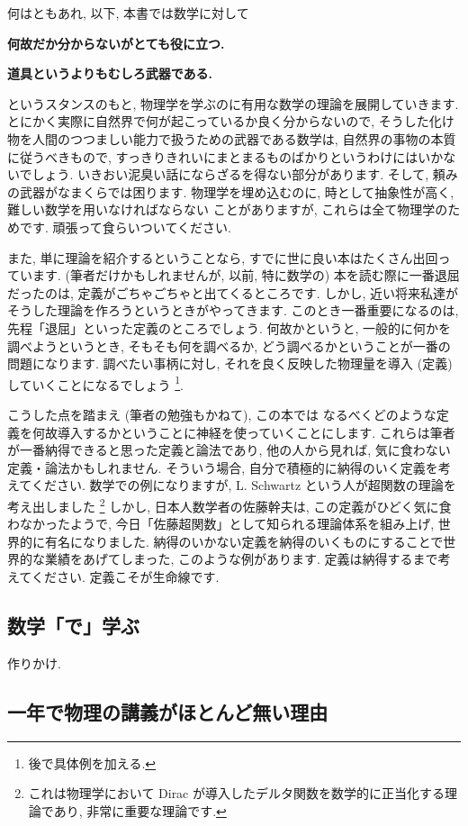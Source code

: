 \documentclass[openany, a4paper, oneside]{book}
\theoremstyle{break}
\theoremstyle{breakdefn}
\begin{document}
何はともあれ, 以下, 本書では数学に対して
\begin{center}
\textbf{何故だか分からないがとても役に立つ.}

\textbf{道具というよりもむしろ武器である.}
\end{center}
というスタンスのもと, 物理学を学ぶのに有用な数学の理論を展開していきます.
とにかく実際に自然界で何が起こっているか良く分からないので,
そうした化け物を人間のつつましい能力で扱うための武器である数学は,
自然界の事物の本質に従うべきもので,
すっきりきれいにまとまるものばかりというわけにはいかないでしょう.
いきおい泥臭い話にならざるを得ない部分があります.
そして, 頼みの武器がなまくらでは困ります.
物理学を埋め込むのに, 時として抽象性が高く, 難しい数学を用いなければならない
ことがありますが, これらは全て物理学のためです.
頑張って食らいついてください.

また, 単に理論を紹介するということなら, すでに世に良い本はたくさん出回っています.
(筆者だけかもしれませんが, 以前, 特に数学の) 本を読む際に一番退屈だったのは,
定義がごちゃごちゃと出てくるところです.
しかし, 近い将来私達がそうした理論を作ろうというときがやってきます.
このとき一番重要になるのは, 先程「退屈」といった定義のところでしょう.
何故かというと, 一般的に何かを調べようというとき,
そもそも何を調べるか, どう調べるかということが一番の問題になります.
調べたい事柄に対し, それを良く反映した物理量を導入 (定義) していくことになるでしょう \footnote{後で具体例を加える.
 }.

こうした点を踏まえ (筆者の勉強もかねて), この本では
なるべくどのような定義を何故導入するかということに神経を使っていくことにします.
これらは筆者が一番納得できると思った定義と論法であり, 他の人から見れば,
気に食わない定義・論法かもしれません.
そういう場合, 自分で積極的に納得のいく定義を考えてください.
数学での例になりますが, L. Schwartz という人が超関数の理論を考え出しました \footnote{これは物理学において Dirac が導入したデルタ関数を数学的に正当化する理論であり,
非常に重要な理論です.
 }
しかし, 日本人数学者の佐藤幹夫は, この定義がひどく気に食わなかったようで,
今日「佐藤超関数」として知られる理論体系を組み上げ, 世界的に有名になりました.
納得のいかない定義を納得のいくものにすることで世界的な業績をあげてしまった, このような例があります.
定義は納得するまで考えてください.
定義こそが生命線です.
\subsection{数学「で」学ぶ}
\label{sec-4-3-1-2}

作りかけ.
\subsection{一年で物理の講義がほとんど無い理由}
\label{sec-4-3-1-3}
\end{document}
